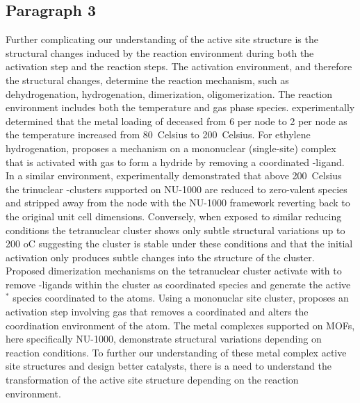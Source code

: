 \documentclass[journal=jctcce,manuscript=article]{achemso}
\begin{document}
\subsection{Paragraph 3}
Further complicating our understanding of the active site structure is the structural changes induced  by the reaction environment during both the activation step and the reaction steps. The activation environment, and therefore the structural changes, determine the reaction mechanism, such as dehydrogenation, hydrogenation, dimerization, oligomerization. The reaction environment includes both the temperature and gas phase species. \citeauthor{Kim2015} experimentally determined that the metal loading of  deceased from  6  per node to 2  per node as the temperature increased from \SI{80}{Celsius} to \SI{200}{Celsius}.\cite{Kim2015} For ethylene hydrogenation, \citeauthor{Li2016sintering} proposes a mechanism on a mononuclear (single-site)  complex that is activated with  gas to form a  hydride by removing a coordinated -ligand.\cite{Li2016sintering} In a similar  environment, \citeauthor{Halder2020} experimentally demonstrated that above \SI{200}{Celsius} the trinuclear -clusters supported on NU-1000 are reduced to zero-valent  species and stripped away from the node with the NU-1000 framework reverting back to the original unit cell dimensions.\cite{Halder2020} Conversely, when exposed to similar reducing conditions the tetranuclear  cluster shows only subtle structural variations up to 200 oC\cite{PlateroPrats2017} suggesting the cluster is stable under these conditions and that the initial activation only produces subtle changes into the structure of the cluster. Proposed dimerization mechanisms on the tetranuclear  cluster activate with  to remove -ligands within the cluster as coordinated  species and generate the active $^*$ species coordinated to the  atoms.\cite{Ye2017} Using a mononuclar site  cluster, \citeauthor{Li2017} proposes an activation step involving  gas that removes a coordinated  and alters the coordination environment of the  atom. The metal complexes supported on MOFs, here specifically NU-1000, demonstrate structural variations depending on reaction conditions. To further our understanding of these metal complex active site structures and design better catalysts, there is a need to understand the transformation of the active site structure depending on the reaction environment. 
\end{document}
